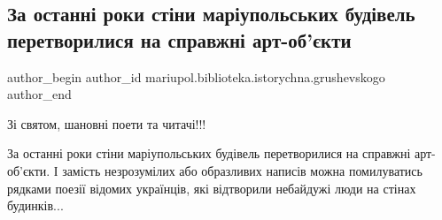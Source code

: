  
 
 
 
 

\subsection{За останні роки стіни маріупольських будівель перетворилися на справжні арт-об'єкти}
\label{sec:22_03_2019.fb.mariupol.biblioteka.istorychna.grushevskogo.1.za_ostann__roki_st_n}

\ifcmt
 author_begin
   author_id mariupol.biblioteka.istorychna.grushevskogo
 author_end
\fi

Зі святом, шановні поети та читачі!!!

За останні роки стіни маріупольських будівель перетворилися на справжні
арт-об'єкти. І замість незрозумілих або образливих написів можна помилуватись
рядками поезії відомих українців, які відтворили небайдужі люди на  стінах
будинків...
